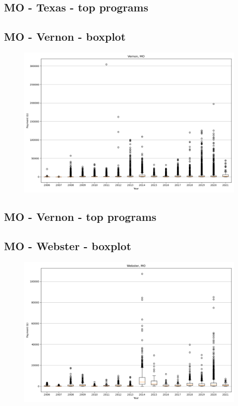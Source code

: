 \subsection*{MO - Texas - top programs}

\newpage
\subsection*{MO - Vernon - boxplot}
\begin{figure}[h]
\centering
\includegraphics[width=7in]{../output/boxplots/counties/Vernon-MO_boxplot.png}
\end{figure}


\subsection*{MO - Vernon - top programs}

\newpage
\subsection*{MO - Webster - boxplot}
\begin{figure}[h]
\centering
\includegraphics[width=7in]{../output/boxplots/counties/Webster-MO_boxplot.png}
\end{figure}


